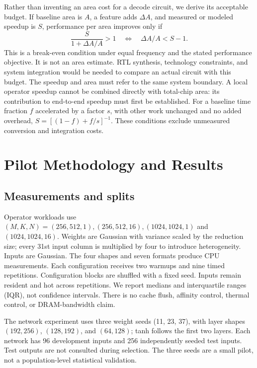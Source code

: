 \documentclass[11pt]{article}
\begin{document}
Rather than inventing an area cost for a decode circuit, we derive its acceptable
budget. If baseline area is $A$, a feature adds $\Delta A$, and measured or modeled
speedup is $S$, performance per area improves only if
\begin{equation}
\frac{S}{1+\Delta A/A}>1\quad\Longleftrightarrow\quad
\Delta A/A<S-1.
\label{eq:area}
\end{equation}
This is a break-even condition under equal frequency and the stated performance
objective. It is not an area estimate. RTL synthesis, technology constraints, and
system integration would be needed to compare an actual circuit with this budget.
The speedup and area must refer to the same system boundary. A local operator
speedup cannot be combined directly with total-chip area: its contribution to
end-to-end speedup must first be established. For a baseline time fraction $f$
accelerated by a factor $s$, with other work unchanged and no added overhead,
$S=[(1-f)+f/s]^{-1}$. These conditions exclude unmeasured conversion and integration
costs.

\section{Pilot Methodology and Results}
\subsection{Measurements and splits}
Operator workloads use $(M,K,N)=(256,512,1),(256,512,16),(1024,1024,1)$ and
$(1024,1024,16)$. Weights are Gaussian with variance scaled by the reduction
size; every 31st input column is multiplied by four to introduce heterogeneity.
Inputs are Gaussian. The four shapes and seven formats produce \OpCount{} CPU
measurements. Each configuration receives two warmups and nine timed repetitions.
Configuration blocks are shuffled with a fixed seed. Inputs remain resident and
hot across repetitions. We report medians and interquartile ranges (IQR), not
confidence intervals. There is no cache flush, affinity control, thermal control,
or DRAM-bandwidth claim.

The network experiment uses three weight seeds (11, 23, 37), with layer shapes
$(192,256)$, $(128,192)$, and $(64,128)$; tanh follows the first two layers. Each network
has 96 development inputs and 256 independently seeded test inputs. Test outputs
are not consulted during selection. The three seeds are a small pilot, not a
population-level statistical validation.
\end{document}
